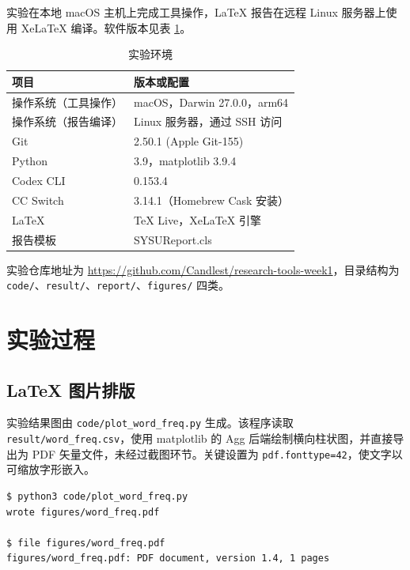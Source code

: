 \documentclass{SYSUReport}
\begin{document}
实验在本地 macOS 主机上完成工具操作，LaTeX 报告在远程 Linux 服务器上使用 XeLaTeX 编译。软件版本见表 \ref{tab:env}。

\begin{table}[htbp]
    \centering
    \caption{实验环境}
    \label{tab:env}
    \begin{tabular}{ll}
        \toprule
        项目 & 版本或配置 \\
        \midrule
        操作系统（工具操作）  & macOS，Darwin 27.0.0，arm64 \\
        操作系统（报告编译）  & Linux 服务器，通过 SSH 访问 \\
        Git                 & 2.50.1 (Apple Git-155) \\
        Python              & 3.9，matplotlib 3.9.4 \\
        Codex CLI           & 0.153.4 \\
        CC Switch           & 3.14.1（Homebrew Cask 安装） \\
        LaTeX               & TeX Live，XeLaTeX 引擎 \\
        报告模板            & SYSUReport.cls \\
        \bottomrule
    \end{tabular}
\end{table}

实验仓库地址为 \url{https://github.com/Candlest/research-tools-week1}，目录结构为 \verb|code/|、\verb|result/|、\verb|report/|、\verb|figures/| 四类。

\section{实验过程}
\label{sec:process}

\subsection{LaTeX 图片排版}

实验结果图由 \verb|code/plot_word_freq.py| 生成。该程序读取 \verb|result/word_freq.csv|，使用 matplotlib 的 Agg 后端绘制横向柱状图，并直接导出为 PDF 矢量文件，未经过截图环节。关键设置为 \verb|pdf.fonttype=42|，使文字以可缩放字形嵌入。

\begin{lstlisting}[style=shell, caption={生成矢量结果图}]
$ python3 code/plot_word_freq.py
wrote figures/word_freq.pdf

$ file figures/word_freq.pdf
figures/word_freq.pdf: PDF document, version 1.4, 1 pages
\end{lstlisting}
\end{document}
